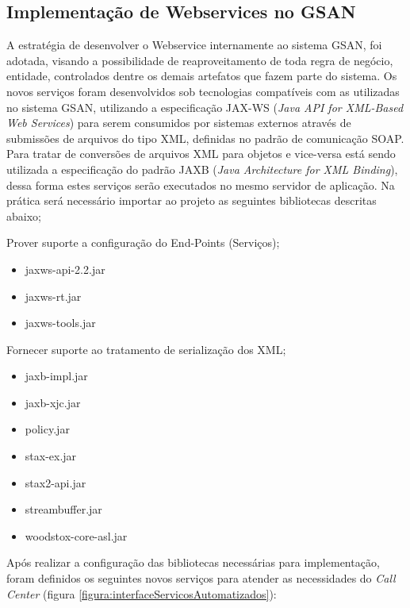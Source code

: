 \subsection{Implementação de Webservices no GSAN}

A estratégia de desenvolver o Webservice internamente ao sistema GSAN, foi adotada, visando a possibilidade de reaproveitamento de toda regra de negócio, entidade, controlados dentre os demais artefatos que fazem parte do sistema.  Os novos serviços foram desenvolvidos sob tecnologias compatíveis com as utilizadas no sistema GSAN, utilizando a especificação JAX-WS (\textit{Java API for XML-Based Web Services}) para serem consumidos por sistemas externos através de submissões de arquivos do tipo XML, definidas no padrão de comunicação SOAP. Para tratar de conversões de arquivos XML para objetos e vice-versa está sendo utilizada a especificação do padrão JAXB (\textit{Java Architecture for XML Binding}), dessa forma estes serviços serão executados no mesmo servidor de aplicação.
Na prática será necessário importar ao projeto as seguintes bibliotecas descritas abaixo;

\begin{description}
	\item Prover suporte a configuração do End-Points (Serviços);
	\begin{itemize}
		\item jaxws-api-2.2.jar
		\item jaxws-rt.jar
		\item jaxws-tools.jar		
	\end{itemize}
	\item Fornecer suporte ao tratamento de serialização dos XML;
	\begin{itemize}
		\item jaxb-impl.jar
		\item jaxb-xjc.jar
		\item policy.jar
		\item stax-ex.jar
		\item stax2-api.jar
		\item streambuffer.jar
		\item woodstox-core-asl.jar		
	\end{itemize}
\end{description}

Após realizar a configuração das bibliotecas necessárias para implementação, foram definidos os seguintes novos serviços para atender as necessidades do \textit{Call Center} (figura \ref{figura:interfaceServicosAutomatizados}):

